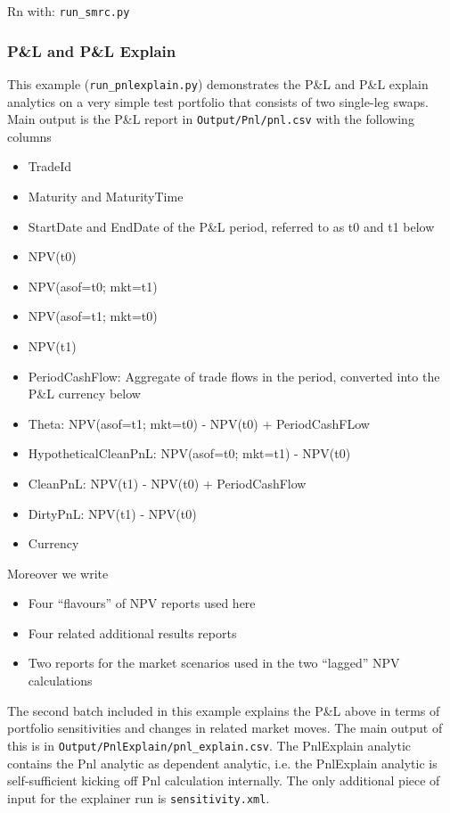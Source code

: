 Rn with: {\tt run\_smrc.py}

\subsubsection{P\&L and P\&L Explain}
\label{example:marketrisk_pnl}

This example ({\tt run\_pnlexplain.py}) demonstrates the P\&L and P\&L explain analytics
on a very simple test portfolio that consists of two
single-leg swaps. 
Main output is the P\&L report in {\tt Output/Pnl/pnl.csv} with the following columns
\begin{itemize}
\item TradeId
\item Maturity and MaturityTime
\item StartDate and EndDate of the P\&L period, referred to as t0 and t1 below
\item NPV(t0)
\item NPV(asof=t0; mkt=t1)
\item NPV(asof=t1; mkt=t0)
\item NPV(t1)
\item PeriodCashFlow: Aggregate of trade flows in the period, converted into the P\&L currency below
\item Theta: NPV(asof=t1; mkt=t0) - NPV(t0) + PeriodCashFLow
\item HypotheticalCleanPnL: NPV(asof=t0; mkt=t1) - NPV(t0)
\item CleanPnL: NPV(t1) - NPV(t0) + PeriodCashFlow 
\item DirtyPnL: NPV(t1) - NPV(t0)
\item Currency
\end{itemize}
Moreover we write
\begin{itemize}
\item Four ``flavours'' of NPV reports used here
\item Four related additional results reports
\item Two reports for the market scenarios used in the two ``lagged'' NPV calculations
\end{itemize}

The second batch included in this example explains the
P\&L above in terms of portfolio sensitivities and changes in related market moves. The main output of this
is in {\tt Output/PnlExplain/pnl\_explain.csv}. The PnlExplain analytic contains the Pnl analytic as dependent
analytic, i.e. the PnlExplain analytic is self-sufficient kicking off Pnl calculation internally. 
The only additional piece of input for the explainer run is {\tt sensitivity.xml}.

